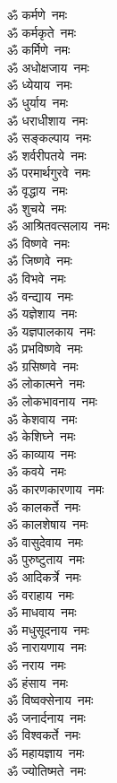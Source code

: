 \begin{multicols}{2}
\begin{flushleft}
ॐ कर्मणे~नमः\\
ॐ कर्मकृते~नमः\\
ॐ कर्मिणे~नमः\\
ॐ अधोक्षजाय~नमः\\
ॐ ध्येयाय~नमः\\
ॐ धुर्याय~नमः\\
ॐ धराधीशाय~नमः\\
ॐ सङ्कल्पाय~नमः\hfill{}\\
ॐ शर्वरीपतये~नमः\\
ॐ परमार्थगुरवे~नमः\\
ॐ वृद्धाय~नमः\\
ॐ शुचये~नमः\\
ॐ आश्रितवत्सलाय~नमः\\
ॐ विष्णवे~नमः\\
ॐ जिष्णवे~नमः\\
ॐ विभवे~नमः\\
ॐ वन्द्याय~नमः\\
ॐ यज्ञेशाय~नमः\hfill{}\\
ॐ यज्ञपालकाय~नमः\\
ॐ प्रभविष्णवे~नमः\\
ॐ ग्रसिष्णवे~नमः\\
ॐ लोकात्मने~नमः\\
ॐ लोकभावनाय~नमः\\
ॐ केशवाय~नमः\\
ॐ केशिघ्ने~नमः\\
ॐ काव्याय~नमः\\
ॐ कवये~नमः\\
ॐ कारणकारणाय~नमः\hfill{}\\
ॐ कालकर्ते~नमः\\
ॐ कालशेषाय~नमः\\
ॐ वासुदेवाय~नमः\\
ॐ पुरुष्टुताय~नमः\\
ॐ आदिकर्त्रे~नमः\\
ॐ वराहाय~नमः\\
ॐ माधवाय~नमः\\
ॐ मधुसूदनाय~नमः\\
ॐ नारायणाय~नमः\\
ॐ नराय~नमः\hfill{}\\
ॐ हंसाय~नमः\\
ॐ विष्वक्सेनाय~नमः\\
ॐ जनार्दनाय~नमः\\
ॐ विश्वकर्ते~नमः\\
ॐ महायज्ञाय~नमः\\
ॐ ज्योतिष्मते~नमः\\

\end{flushleft}
\end{multicols}
